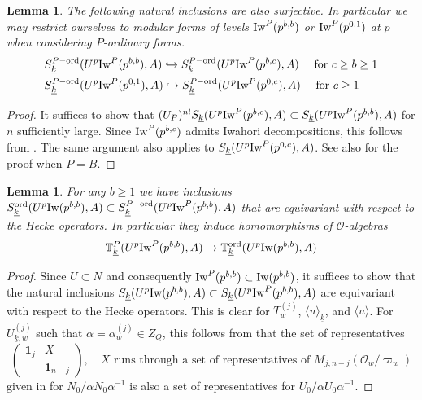 \documentclass[leqno]{amsart}
\newtheorem{lem}[thm]{Lemma}
\theoremstyle{definition}
\theoremstyle{remark}
\newcommand{\id}{\mathbf{1}}
\newcommand{\oo}{\mathcal{O}}
\newcommand{\wt}[1]{\underline{ #1 }}
\newcommand{\Iw}{\textnormal{Iw}} %
\newcommand{\TT}{\mathbb{T}} %
\newcommand{\ord}{\textnormal{ord}} %
\begin{document}
\begin{lem}\label{lem:control}
	The following natural inclusions are also surjective.
    In particular we may restrict ourselves 
    to modular forms of levels $\Iw^P(p^{b,b})$ or $\Iw^P(p^{0,1})$
    at $p$ when considering $P$-ordinary forms.
	\begin{align*}
	&S_{\wt{k}}^{P-\ord}(U^p\Iw^P(p^{b,b}),A)\hookrightarrow	
	S_{\wt{k}}^{P-\ord}(U^p\Iw^P(p^{b,c}),A)\quad 
	\text{ for } c\geq b\geq 1\\
	&S_{\wt{k}}^{P-\ord}(U^p\Iw^P(p^{0,1}),A)\hookrightarrow	
	S_{\wt{k}}^{P-\ord}(U^p\Iw^P(p^{0,c}),A)\quad \text{ for } c\geq 1
	\end{align*}
\end{lem}
\begin{proof}
	It suffices to show that 
	$(U_P)^{n!}S_{\wt{k}}(U^p\Iw^P(p^{b,c}),A)
	\subset S_{\wt{k}}(U^p\Iw^P(p^{b,b}),A)$
	for $n$ sufficiently large. 
	Since $\Iw^P(p^{b,c})$ admits Iwahori decompositions,
	this follows from \cite[Lem 3.3.2]{emeI}.
	The same argument also applies to 
	$S_{\wt{k}}(U^p\Iw^P(p^{0,c}),A)$.
	See also \cite[Lem 2.19]{ger} for the proof when $P=B$.
\end{proof}

\begin{lem}\label{lem:PtoB}
	For any $b\geq 1$
	  we have inclusions
	$S_{\wt{k}}^{\ord}(U^p\Iw(p^{b,b}),A)\subset
	S_{\wt{k}}^{P-\ord}(U^p\Iw^P(p^{b,b}),A)$
    that are equivariant  with respect to the Hecke operators.
    In particular they induce homomorphisms of $\oo$-algebras
	\[
		\TT^P_{\wt{k}}(U^p\Iw^P(p^{b,b}),A)\to
		\TT^{\ord}_{\wt{k}}(U^p\Iw(p^{b,b}),A)
	\]
\end{lem}
\begin{proof}
	Since $U\subset N$ and consequently 
    $\Iw^P(p^{b,b})\subset \Iw(p^{b,b})$,
	it suffices to show that the natural inclusions
	$S_{\wt{k}}(U^p\Iw(p^{b,b}),A)\subset 
	S_{\wt{k}}(U^p\Iw^P(p^{b,b}),A)$
	are equivariant with respect to the Hecke operators.
	This is clear for $T_w^{(j)}$, $\langle u\rangle_{\wt{k}}$,
    and $\langle u\rangle$.
	For $U_{\wt{k},w}^{(j)}$ such that 
	$\alpha=\alpha_w^{(j)}\in Z_Q$, this follows from that
	the set of representatives 
	\[
	\begin{pmatrix}
		\id_j&X\\&\id_{n-j}
	\end{pmatrix},\quad
	X \text{ runs through a set of representatives of }
	M_{j,n-j}(\oo_w/\varpi_w)
	\]
    given in \cite[Lem 2.10]{ger} for $N_0/\alpha N_0\alpha^{-1}$
	is also a set of representatives for 
	$U_0/\alpha U_0\alpha^{-1}$.
\end{proof}
\end{document}
